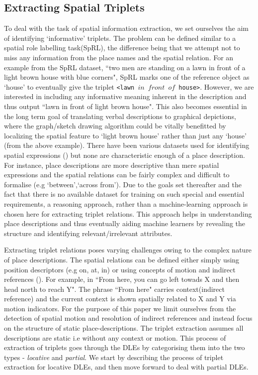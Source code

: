\documentclass{acm_proc_article-sp}
\begin{document}
\subsection{Extracting Spatial Triplets}
To deal with the task of spatial information extraction, we set ourselves the aim of identifying `informative' triplets. The problem can be defined similar to a spatial role labelling task(SpRL), the difference being that we attempt not to miss any information from the place names and the spatial relation. For an example from the SpRL dataset, ``two men are standing on a lawn in front of a light brown house with blue corners", SpRL marks one of the reference object as `house' to eventually give the triplet \texttt{<lawn $in$ $front$ $of$  house>}. However, we are interested in including any informative meaning inherent in the description and thus output ``lawn in front of light brown house". This also becomes essential in the long term goal of translating verbal descriptions to graphical depictions, where the graph/sketch drawing algorithm could be vitally benefitted by localizing the spatial feature to `light brown house' rather than just any `house' (from the above example). There have been various datasets used for identifying spatial expressions (\cite{Bateman:data,CLEF:data, parisa:semeval})  but none are characteristic enough of a place description. For instance, place descriptions are more descriptive than mere spatial expressions and the spatial relations can be fairly complex and difficult to formalise (e.g `between',`across from').  Due to the goals set thereafter and the fact that there is no available dataset for training on such special and essential requirements, a reasoning approach, rather than a machine-learning approach is chosen here for extracting triplet relations. This approach helps in understanding place descriptions and thus eventually aiding machine learners by revealing the structure and identifying relevant/irrelevant attributes. 

Extracting triplet relations poses varying challenges owing to the complex nature of place descriptions. The spatial relations can be defined either simply using position descriptors (e.g on, at, in) or using concepts of motion and indirect references (\cite{zlatev:semantics}). For example, in ``From here, you can go left towads X and then head north to reach Y". The phrase ``From here" carries context(indirect reference) and the current context is shown spatially related to X and Y via motion indicators. For the purpose of this paper we limit ourselves from the detection of spatial motion and resolution of indirect references and instead focus on the structure of static place-descriptions. The triplet extraction assumes all descriptions are static i.e without any context or motion. This process of extraction of triplets goes through the DLEs by categorising them into the two types - \textit{locative} and \textit{partial}. We start by describing the process of triplet extraction for locative DLEs, and then move forward to deal with partial DLEs. 
\end{document}
